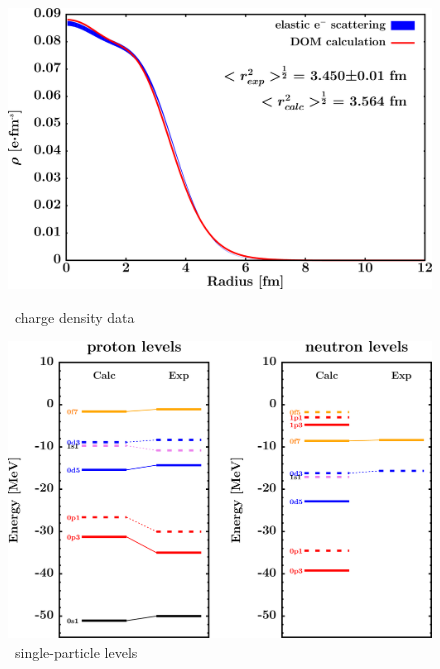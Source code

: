 \begin{figure}[H]
    \centering
    \begin{minipage}{0.45\textwidth}
        \centering
        \includegraphics[width=1.0\textwidth]{figures/ca40_chargeDensity.png}
        \caption{\caForty\ charge density data}
        \label{DOMFitData_ca40_chargeDensity}
    \end{minipage}\hfill
    \begin{minipage}{0.45\textwidth}
        \centering
        \includegraphics[width=1.0\textwidth]{figures/ca40_SPLevels.png}
        \caption{\caForty\ single-particle levels}
        \label{DOMFitData_ca40_SPLevels}
    \end{minipage}
\end{figure}

\afterpage{\clearpage}

